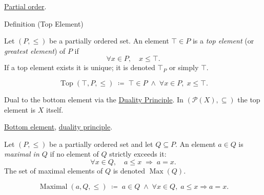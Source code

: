 \begin{remark*}[Dependencies]
\hyperref[def:lattice-order-partial-order]{Partial order}.
\end{remark*}


\begin{definitionbox}{Definition (Top Element)}
\begin{definition}
\label{def:top-element}
Let $(P, \leq)$ be a partially ordered set.  An element $\top \in P$ is
a \emph{top element} (or \emph{greatest element}) of $P$ if
\[
\forall x \in P, \quad x \leq \top.
\]
If a top element exists it is unique; it is denoted $\top_P$ or simply
$\top$.
\end{definition}
\end{definitionbox}

\begin{remark*}
\[
\operatorname{Top}(\top, P, \leq)
\;\coloneqq\;
\top \in P \;\land\; \forall x \in P,\; x \leq \top.
\]
\end{remark*}

\begin{remark*}[Interpretation]
Dual to the bottom element via the
\hyperref[prop:duality-principle]{Duality Principle}.
In $(\mathcal{P}(X), \subseteq)$ the top element is $X$ itself.
\end{remark*}

\begin{remark*}[Dependencies]
\hyperref[def:bottom-element]{Bottom element},
\hyperref[prop:duality-principle]{duality principle}.
\end{remark*}


\begin{definition}
\label{def:maximal-element}
Let $(P, \leq)$ be a partially ordered set and let $Q \subseteq P$.  An
element $a \in Q$ is \emph{maximal in $Q$} if no element of $Q$ strictly
exceeds it:
\[
\forall x \in Q, \quad a \leq x \;\Longrightarrow\; a = x.
\]
The set of maximal elements of $Q$ is denoted $\operatorname{Max}(Q)$.
\end{definition}

\begin{remark*}
\[
\operatorname{Maximal}(a, Q, \leq)
\;\coloneqq\;
a \in Q \;\land\; \forall x \in Q,\; a \leq x \Rightarrow a = x.
\]
\end{remark*}

